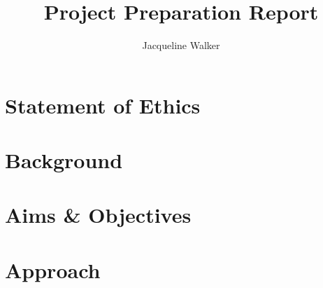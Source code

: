 \documentclass[a4paper,12pt]{report}
\title{Project Preparation Report}
\author{Jacqueline Walker}
\begin{document}
    \maketitle
    
    \newpage
    \tableofcontents
    \newpage
    
    \begin{frabstract}
            \blindtext[1]
    \end{frabstract}

    \vfill{}
    {\let\clearpage\relax \chapter*{Statement of Ethics}}
    \blindtext[1]
    \vspace{24pt}

    \chapter{Background}
    \blindtext[12]

    \chapter{Aims \& Objectives}
    \blindtext[12]

    \chapter{Approach}
    \blindtext[12]

    \nocite{*}
    \frreferences
\end{document}
